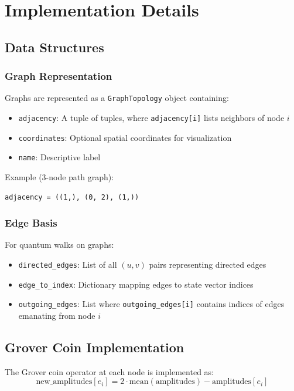 \documentclass[12pt,a4paper]{article}
\begin{document}
\section{Implementation Details}

\subsection{Data Structures}

\subsubsection{Graph Representation}
Graphs are represented as a \texttt{GraphTopology} object containing:
\begin{itemize}
    \item \texttt{adjacency}: A tuple of tuples, where \texttt{adjacency[i]} lists neighbors of node $i$
    \item \texttt{coordinates}: Optional spatial coordinates for visualization
    \item \texttt{name}: Descriptive label
\end{itemize}

Example (3-node path graph):
\begin{verbatim}
adjacency = ((1,), (0, 2), (1,))
\end{verbatim}

\subsubsection{Edge Basis}
For quantum walks on graphs:
\begin{itemize}
    \item \texttt{directed\_edges}: List of all $(u, v)$ pairs representing directed edges
    \item \texttt{edge\_to\_index}: Dictionary mapping edges to state vector indices
    \item \texttt{outgoing\_edges}: List where \texttt{outgoing\_edges[i]} contains indices of edges emanating from node $i$
\end{itemize}

\subsection{Grover Coin Implementation}

The Grover coin operator at each node is implemented as:
\begin{equation}
\text{new\_amplitudes}[e_i] = 2 \cdot \text{mean}(\text{amplitudes}) - \text{amplitudes}[e_i]
\end{equation}
\end{document}
